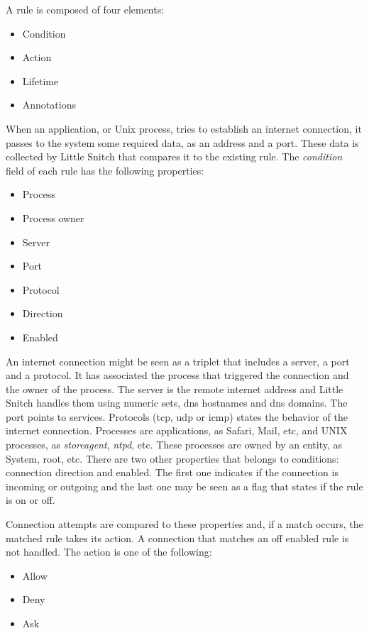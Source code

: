 A rule is composed of four elements:

\begin{itemize}
\item Condition
\item Action
\item Lifetime
\item Annotations
\end{itemize}

When an application, or Unix process, tries to establish an internet connection, it passes to the system some required data, as an address and a port. These data is collected by Little Snitch that compares it to the existing rule. The \textit{condition} field of each rule has the following properties:

\begin{itemize}
 \item Process
 \item Process owner
 \item Server
 \item Port
 \item Protocol
 \item Direction
 \item Enabled
\end{itemize}

An internet connection might be seen as a triplet that includes a server, a port and a protocol. It has associated the process that triggered the connection and the owner of the process. The server is the remote internet address and Little Snitch handles them using numeric sets, \gls{dns} hostnames and \gls{dns} domains. The port points to services. Protocols (\gls{tcp}, \gls{udp} or \gls{icmp}) states the behavior of the internet connection. Processes are applications, as Safari, Mail, etc, and UNIX processes, as \textit{storeagent}, \textit{ntpd}, etc. These processes are owned by an entity, as System, root, etc. There are two other properties that belongs to conditions: connection direction and enabled. The first one indicates if the connection is incoming or outgoing and the last one may be seen as a flag that states if the rule is on or off.

Connection attempts are compared to these properties and, if a match occurs, the matched rule takes its action. A connection that matches an off enabled rule is not handled. The action is one of the following:

\begin{itemize}
 \item Allow
 \item Deny
 \item Ask
\end{itemize}

